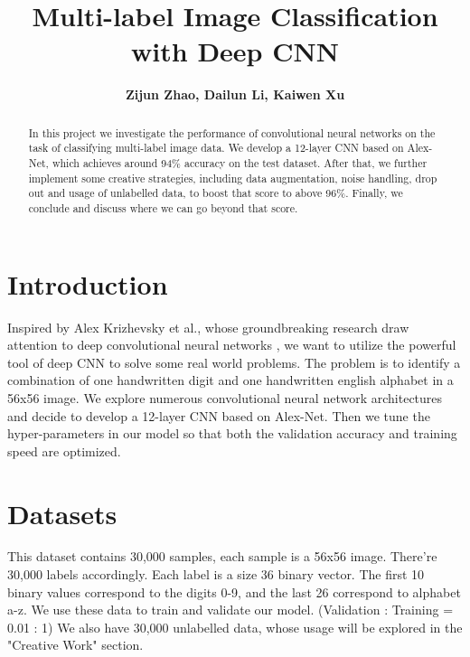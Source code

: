 \documentclass[11pt]{diazessay} %
\title{\textbf{Multi-label Image Classification with Deep CNN } } %
\author{\textbf{Zijun Zhao, Dailun Li, Kaiwen Xu} } %
\begin{document}
\maketitle %


\begin{abstract}
In this project we investigate the performance of convolutional neural networks on the task of classifying multi-label image data. We develop a 12-layer CNN based on Alex-Net, which achieves around 94\% accuracy on the test dataset. After that, we further implement some creative strategies, including data augmentation, noise handling, drop out and usage of unlabelled data, to boost that score to above 96\%. Finally, we conclude and discuss where we can go beyond that score. \end{abstract}


\section{Introduction}
Inspired by Alex Krizhevsky et al., whose groundbreaking research draw attention to deep convolutional neural networks \cite{Alex}, we want to utilize the powerful tool of deep CNN to solve some real world problems. The problem is to identify a combination of one handwritten digit and one handwritten english alphabet in a 56x56 image. We explore numerous convolutional neural network architectures and decide to develop a 12-layer CNN based on Alex-Net. Then we tune the hyper-parameters in our model so that both the validation accuracy and training speed are optimized.

\section{Datasets}
This dataset contains 30,000 samples, each sample is a 56x56 image. There're 30,000 labels accordingly. Each label is a size 36 binary vector. The first 10 binary values correspond to the digits 0-9, and the last 26 correspond to alphabet a-z. We use these data to train and validate our model. (Validation : Training = 0.01 : 1) We also have 30,000 unlabelled data, whose usage will be explored in the "Creative Work" section.
\end{document}
